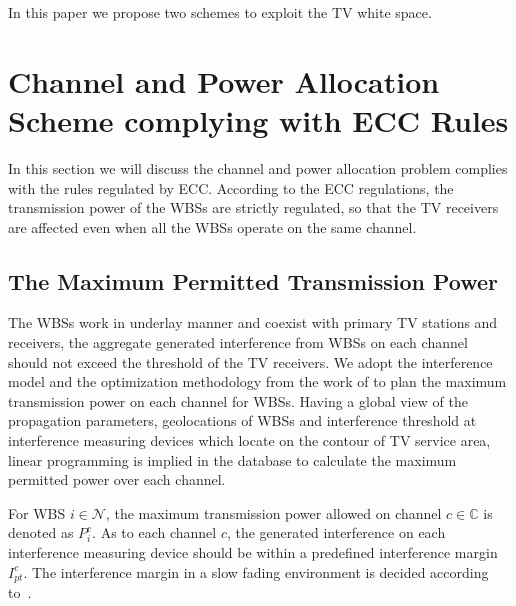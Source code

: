 \documentclass[times]{ettauth}
\theoremstyle{mytheoremstyle}
\theoremstyle{mytheoremstyle}
\theoremstyle{mytheoremstyle}
\begin{document}

In this paper we propose two schemes to exploit the TV white space.
\section{Channel and Power Allocation Scheme complying with ECC Rules}

In this section we will discuss the channel and power allocation problem complies with the rules regulated by ECC.
According to the ECC regulations, the transmission power of the WBSs are strictly regulated, so that the TV receivers are affected even when all the WBSs operate on the same channel.
\subsection{The Maximum Permitted Transmission Power}
\label{powermap}
The WBSs work in underlay manner and coexist with primary TV stations and receivers, the aggregate generated interference from WBSs on each channel should not exceed the threshold of the TV receivers.
We adopt the interference model and the optimization methodology from the work of \cite{multipleIntf_pimrc11} to plan the maximum transmission power on each channel for WBSs.
Having a global view of the propagation parameters, geolocations of WBSs and interference threshold at interference measuring devices which locate on the contour of TV service area, linear programming is implied in the database to calculate the maximum permitted power over each channel.

For WBS $i\in \mathcal{N}$, the maximum transmission power allowed on channel $c\in \mathbb{C}$ is denoted as $P_i^c$. 
As to each channel $c$, the generated interference on each interference measuring device should be within a predefined interference margin $I^c_{pt}$.
The interference margin in a slow fading environment is decided according to~\cite{aggregate_interference_shadow_fading_2010}.
\end{document}
